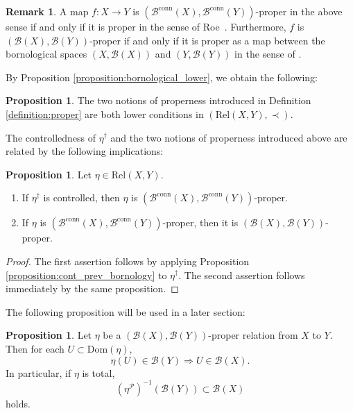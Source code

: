 \documentclass[12pt, a4paper]{amsart}
\theoremstyle{definition}
\newtheorem{proposition}[theorem]{Proposition}
\newtheorem{remark}[theorem]{Remark}
\newcommand{\Rel}{\mathrm{Rel}}
\newcommand{\Dom}{\mathrm{Dom}}
\begin{document}
\begin{remark}
A map $f : X \rightarrow Y$ is $(\mathcal{B}^{\mathrm{conn}}(X),\mathcal{B}^{\mathrm{conn}}(Y))$-proper in the above sense if and only if it is proper in the sense of Roe~\cite[Definition 2.21]{Roe2003LectureCoarse}. Furthermore, $f$ is $(\mathcal{B}(X),\mathcal{B}(Y))$-proper if and only if it is proper as a map between the bornological spaces $(X,\mathcal{B}(X))$ and $(Y,\mathcal{B}(Y))$ in the sense of \cite[Definition 2.8]{BunkeEngel2020}.
\end{remark}

By Proposition \ref{proposition:bornological_lower}, we obtain the following:

\begin{proposition}\label{proposition:properlower}
The two notions of properness introduced in Definition \ref{definition:proper} are both lower conditions in $(\Rel(X,Y),\prec)$.
\end{proposition}

The controlledness of $\eta^\dagger$ and the two notions of properness introduced above are related by the following implications:

\begin{proposition}\label{proposition:CE_is_proper}
Let $\eta \in \Rel(X,Y)$.
\begin{enumerate}
    \item If $\eta^\dagger$ is controlled, then $\eta$ is $(\mathcal{B}^{\mathrm{conn}}(X),\mathcal{B}^{\mathrm{conn}}(Y))$-proper.
    \item If $\eta$ is $(\mathcal{B}^{\mathrm{conn}}(X),\mathcal{B}^{\mathrm{conn}}(Y))$-proper, then it is $(\mathcal{B}(X),\mathcal{B}(Y))$-proper.
\end{enumerate}
\end{proposition}

\begin{proof}
The first assertion follows by applying Proposition \ref{proposition:cont_prev_bornology} to $\eta^\dagger$. The second assertion follows immediately by the same proposition.
\end{proof}

The following proposition will be used in a later section:

\begin{proposition}\label{proposition:proper_prev_unbounded}
Let $\eta$ be a $(\mathcal{B}(X),\mathcal{B}(Y))$-proper relation from $X$ to $Y$. 
Then
for each $U \subset \Dom(\eta)$,
\[
\eta(U) \in \mathcal{B}(Y) \Rightarrow 
U \in \mathcal{B}(X).
\]
In particular, if $\eta$ is total, 
\[
(\eta^\mathcal{P})^{-1}(\mathcal{B}(Y)) \subset \mathcal{B}(X)
\]
holds.
\end{proposition}
\end{document}
